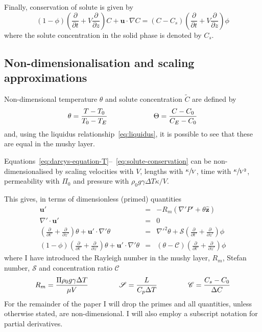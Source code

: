 \documentclass[11pt]{proc}
\newcommand{\St}{\mathscr{S}}
\newcommand{\CompRatio}{\mathscr{C}}
\begin{document}
Finally, conservation of solute is given by
\begin{equation}
\label{eq:solute-conservation}
(1-\phi) \left( \frac{\partial}{\partial t} + V\frac{\partial}{\partial z}\right) C + \mathbf{u} \cdot \nabla C = (C-C_s) \left( \frac{\partial}{\partial t} + V\frac{\partial}{\partial z}\right) \phi
\end{equation}
where the solute concentration in the solid phase is denoted by $C_s$.

\subsection{Non-dimensionalisation and scaling approximations}
\label{sec:approximations}
Non-dimensional temperature $\theta$ and solute concentration $\tilde{C}$ are defined by
\begin{equation}
\theta = \frac{T-T_0}{T_0 - T_E} \hspace{15ex} \Theta = \frac{C-C_0}{C_E-C_0}
\end{equation}
and, using the liquidus relationship~\eqref{eq:liquidus}, it is possible to see that these are equal in the mushy layer.


Equations~\eqref{eq:darcys-equation-T}--~\eqref{eq:solute-conservation} can be non-dimensionalised by scaling velocities with $V$, lengths with $\sfrac{\kappa}{V}$, time with $\sfrac{\kappa}{V^2}$, permeability with $\Pi_0$ and pressure with $\rho_0 g \gamma \Delta T \kappa / V$.

This gives, in terms of dimensionless (primed) quantities
\begin{eqnarray}
\mathbf{u'} &=& - R_m \left(\nabla' P' + \theta \mathbf{\hat{z}} \right)  \label{eq:darcy-dimless}\\
\nabla' \cdot \mathbf{u'} &=& 0 \label{eq:mass-conservation-dimless}\\
\left( \frac{\partial}{\partial t'} + \frac{\partial}{\partial z'}\right) \theta + \mathbf{u'} \cdot \nabla' \theta &=& \nabla'^2 \theta  + \St \left( \frac{\partial}{\partial t'} + \frac{\partial}{\partial z'} \right) \phi  \label{eq:heat-conservation-dimless} \\
(1-\phi) \left( \frac{\partial}{\partial t'} + \frac{\partial}{\partial z'}\right) \theta + \mathbf{u'} \cdot \nabla' \theta &=& (\theta-\CompRatio) \left( \frac{\partial}{\partial t'} + \frac{\partial}{\partial z'}\right) \phi \label{eq:solute-conservation-dimless}
\end{eqnarray}
where I have introduced the Rayleigh number in the mushy layer, $R_m$, Stefan number, $\St$ and concentration ratio $\CompRatio$
\begin{eqnarray}
R_m = \frac{\Pi \rho_0 g \gamma \Delta T}{\mu V} \hspace{10ex} \St = \frac{L}{C_p \Delta T} \hspace{10ex} \CompRatio = \frac{C_s - C_0}{\Delta C}
\end{eqnarray}
For the remainder of the paper I will drop the primes and all quantities, unless otherwise stated, are non-dimensional. I will also employ a subscript notation for partial derivatives.
\end{document}

